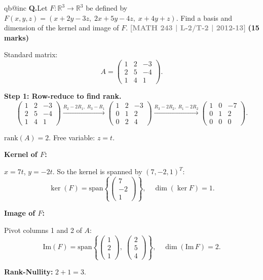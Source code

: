 \documentclass[12pt,a3paper]{article}
\makeatletter
\newcommand{\yr}[1]{\hfill\textcolor{gray}{\small\textbf{[#1]}}}
\newcommand{\mk}[1]{\textcolor{orange!70!black}{\small\textbf{(#1 marks)}}}
\newcounter{qnum}
\newcommand{\Q}[1]{%
  \csname qb@inc\endcsname
  \needspace{4\baselineskip}
  \refstepcounter{qnum}
  \vspace{6pt}
  \noindent\textbf{Q\theqnum.}\enspace #1\par
}
\makeatother
\begin{document}
\Q{Let $F: \mathbb{R}^3 \to \mathbb{R}^3$ be defined by $F(x,y,z) = (x+2y-3z,\; 2x+5y-4z,\; x+4y+z)$. Find a basis and dimension of the kernel and image of $F$.
\yr{MATH 243 | L-2/T-2 | 2012-13} \mk{15}}

\begin{tcolorbox}[enhanced,breakable,
  colback=cF!4,colframe=cF,boxrule=0.8pt,arc=5pt,
  title={\textbf{Answer --- $F:\mathbb{R}^3\to\mathbb{R}^3$, $F(x,y,z)=(x+2y-3z,\;2x+5y-4z,\;x+4y+z)$: Kernel \& Image}},
  fonttitle=\bfseries\color{white},colbacktitle=cF]

Standard matrix:
\[
A=\begin{pmatrix}1&2&-3\\2&5&-4\\1&4&1\end{pmatrix}.
\]

\textbf{Step 1: Row-reduce to find rank.}
\[
\begin{pmatrix}1&2&-3\\2&5&-4\\1&4&1\end{pmatrix}
\xrightarrow{R_2-2R_1,\;R_3-R_1}
\begin{pmatrix}1&2&-3\\0&1&2\\0&2&4\end{pmatrix}
\xrightarrow{R_3-2R_2,\;R_1-2R_2}
\begin{pmatrix}1&0&-7\\0&1&2\\0&0&0\end{pmatrix}.
\]

$\mathrm{rank}(A)=2$. Free variable: $z=t$.

\textbf{Kernel of $F$:}

$x=7t$, $y=-2t$. So the kernel is spanned by $(7,-2,1)^T$:
\[
\boxed{\ker(F)=\mathrm{span}\!\left\{\begin{pmatrix}7\\-2\\1\end{pmatrix}\right\},\quad\dim(\ker F)=1.}
\]

\textbf{Image of $F$:}

Pivot columns 1 and 2 of $A$:
\[
\boxed{\mathrm{Im}(F)=\mathrm{span}\!\left\{\begin{pmatrix}1\\2\\1\end{pmatrix},\;\begin{pmatrix}2\\5\\4\end{pmatrix}\right\},\quad\dim(\mathrm{Im}\,F)=2.}
\]

\textbf{Rank-Nullity:} $2+1=3$. \checkmark

\end{tcolorbox}
\end{document}
